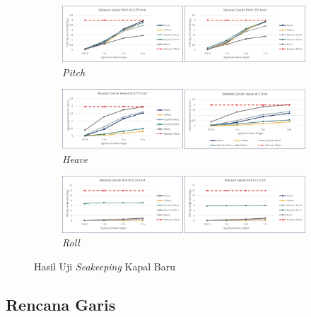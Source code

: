 \begin{figure}[!ht]
    \centering
    \begin{subfigure}{0.95\textwidth}
        \centering
        \includegraphics[width=\textwidth]{grafik/batasan-pitch-new.jpg}
        \caption{\emph{Pitch}}
    \end{subfigure}
    
    \vspace{0.2cm}  %
    
    \begin{subfigure}{0.95\textwidth}
        \centering
        \includegraphics[width=\textwidth]{grafik/batasan-heave-new.jpg}
        \caption{\emph{Heave}}    
    \end{subfigure}
    \vspace{0.2cm}  %
    
    \begin{subfigure}{0.95\textwidth}
        \centering
        \includegraphics[width=\textwidth]{grafik/batasan-roll-new.jpg}
        \caption{\emph{Roll}}    
    \end{subfigure}
    \caption{Hasil Uji \emph{Seakeeping} Kapal Baru}
    \label{fig:hasil-seakeeping-baru}
\end{figure}

\subsection{Rencana Garis}
\label{subsec:rencana-garis-kapal}

